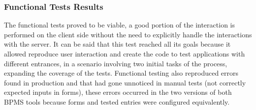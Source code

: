 \documentclass[runningheads,a4paper]{llncs}
\begin{document}
\subsubsection{Functional Tests Results}
The functional tests proved to be viable, a good portion of the interaction is performed on the client side without the need to explicitly handle the interactions with the server. It can be said that this test reached all its goals because it allowed reproduce user interaction and create the code to test applications with different entrances, in a scenario involving two initial tasks of the process, expanding the coverage of the tests. Functional testing also reproduced errors found in production and that had gone unnoticed in manual tests (not correctly expected inputs in forms), these errors occurred in the two versions of both BPMS tools because forms and tested entries were configured equivalently.
\end{document}
